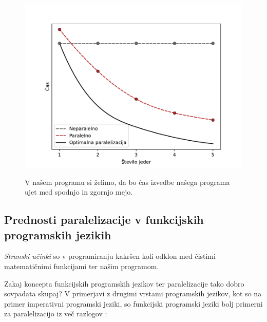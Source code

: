 \documentclass[fin1, tisk]{fmfdelo}
\begin{document}
\begin{figure}[h!]
  \centering
  \caption{V našem programu si želimo, da bo čas izvedbe našega programa ujet med spodnjo in zgornjo mejo.}
  \includegraphics[width=13cm]{slike/cilj-casovne-zahtevnosti-paralelizacije.pdf}
  \label{fig:cilj-casovne-zahtevnosti-paralelizacije}
\end{figure}

\subsection{Prednosti paralelizacije v funkcijskih programskih jezikih}

\emph{Stranski učinki} so v programiranju kakršen koli odklon med čistimi matematičnimi funkcijami ter našim programom.

Zakaj koncepta funkcijskih programskih jezikov ter paralelizacije tako dobro sovpadata skupaj?
V primerjavi z drugimi vrstami programskih jezikov, kot so na primer imperativni programski jeziki,
so funkcijski programski jeziki bolj primerni za paralelizacijo iz več razlogov 
\cite{linke_fundamental_2015, functional_parallel_graph_rewriting}:
\end{document}
